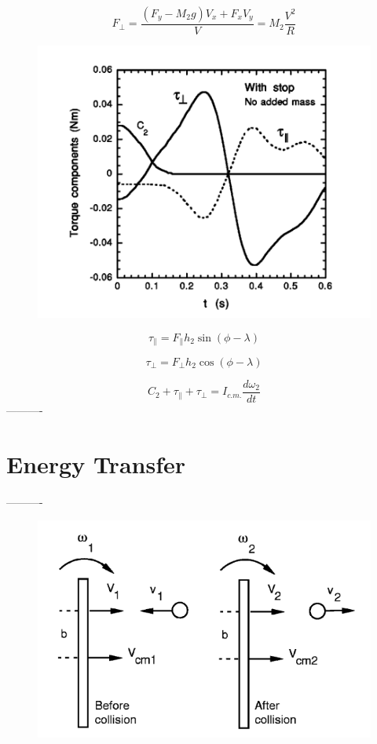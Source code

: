 \documentclass[%
 aip,
 amsmath,amssymb,
 reprint,%
 floatfix,%
]{revtex4-1}
\begin{document}
\begin{equation}
	F_{\perp}=\frac{(F_y - M_2 g)V_x+ F_x V_y}{V} = M_2 \frac{V^2}{R}
\end{equation}

\begin{figure}
	\centering
	\includegraphics[scale=0.4]{totaltorque.png}
	\caption{}
\end{figure}
		
\begin{equation}
	\tau_{\parallel} = F_{\parallel} h_2 \sin{(\phi - \lambda)}
\end{equation}

\begin{equation}
	\tau_{\perp} = F_{\perp} h_2 \cos{(\phi - \lambda)}
\end{equation}

\begin{equation}
	C_2 + \tau_{\parallel} + \tau_{\perp} = I_{c.m.} \frac{d \omega_2}{dt}
\end{equation}
----------

\section{\label{sec:level5}Energy Transfer}

----------

\begin{figure}
	\centering
	\includegraphics[scale=0.4]{momentumtransfer.png}
	\caption{}
\end{figure}
\end{document}
